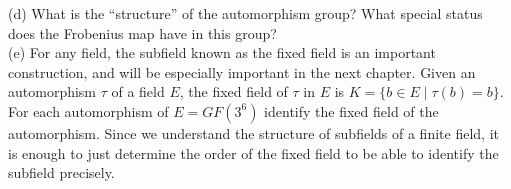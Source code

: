 %
(d)  What is the ``structure'' of the automorphism group?  What special status does the Frobenius map have in this group?\\
%
(e)  For any field, the subfield known as the fixed field is an important construction, and will be especially important in the next chapter.  Given an automorphism $\tau$ of a field $E$, the fixed field of $\tau$ in $E$ is $K=\{b\in E\mid\tau(b)=b\}$.  For each automorphism of $E=GF(3^6)$ identify the fixed field of the automorphism.  Since we understand the structure of subfields of a finite field, it is enough to just determine the order of the fixed field to be able to identify the subfield precisely.
%
\begin{sageverbatim}
\end{sageverbatim}


